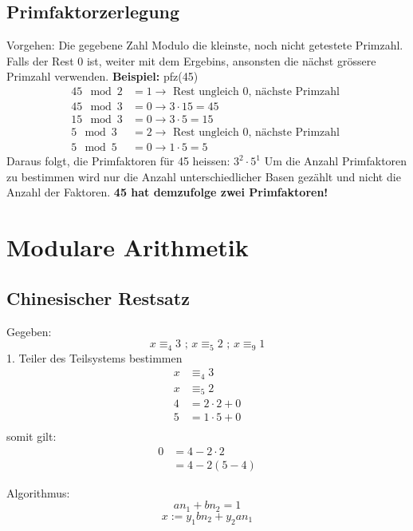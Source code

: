 \subsection{Primfaktorzerlegung} %
\label{sub:primfaktorzerlegung}
Vorgehen: Die gegebene Zahl Modulo die kleinste, noch nicht getestete Primzahl. Falls der Rest 0 ist, weiter mit dem Ergebins, ansonsten die nächst grössere Primzahl verwenden.\newline
\textbf{Beispiel:} pfz(45)
\begin{align*}
	45 \mod 2 &= 1 \rightarrow \text{ Rest ungleich 0, nächste Primzahl } \\
	45 \mod 3 &= 0 \rightarrow 3 \cdot 15 = 45 \\
	15 \mod 3 &= 0 \rightarrow 3 \cdot 5 = 15 \\
	5 \mod 3 &= 2  \rightarrow \text{ Rest ungleich 0, nächste Primzahl } \\
	5 \mod 5 &= 0 \rightarrow 1 \cdot 5 = 5
\end{align*}
Daraus folgt, die Primfaktoren für 45 heissen: \( 3^2 \cdot 5^1 \)\newline
Um die Anzahl Primfaktoren zu bestimmen wird nur die Anzahl unterschiedlicher Basen gezählt und nicht die Anzahl der Faktoren. \textbf{45 hat demzufolge zwei Primfaktoren!}

\section{Modulare Arithmetik} %
\label{sec:modulare_arihmetik}

\subsection{Chinesischer Restsatz}
\begin{bsp}
Gegeben:
$$ x \equiv_4 3 \text{ ; }  x \equiv_5 2\text{ ; }	x \equiv_9 1 $$
1. Teiler des Teilsystems bestimmen\\
\begin{align*}
	x &\equiv_4 3\\
	x &\equiv_5 2\\
	4 &= 2 \cdot 2 + 0\\
	5 &= 1 \cdot 5 + 0\\
\end{align*}
somit gilt:
\begin{align*}
	0 &= 4 - 2 \cdot 2\\
	&= 4 -2(5-4)
\end{align*}
\end{bsp}

Algorithmus:\\
$$an_1 + bn_2 =1$$
$$x := y_1 bn_2 + y_2an_1$$


